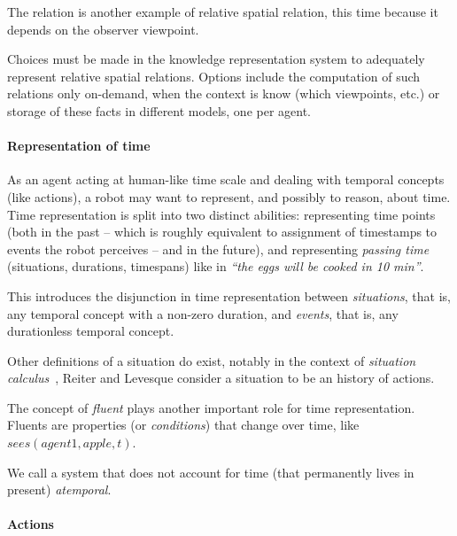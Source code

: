 The relation  is another example of relative spatial relation,
this time because it depends on the observer viewpoint.


Choices must be made in the knowledge representation system to adequately
represent relative spatial relations. Options include the computation of such
relations only on-demand, when the context is know (which viewpoints, etc.) or
storage of these facts in different models, one per agent.


\paragraph{Representation of time}

As an agent acting at human-like time scale and dealing with temporal concepts
(like actions), a robot may want to represent, and possibly to reason, about
time. Time representation is split into two distinct abilities: representing
time points (both in the past -- which is roughly equivalent to assignment of
timestamps to events the robot perceives -- and in the future), and
representing \emph{passing time} (situations, durations, timespans) like in
\emph{``the eggs will be cooked in 10 min''}.

This introduces the disjunction in time representation between
\emph{situations}, that is, any temporal concept with a non-zero duration, and
\emph{events}, that is, any durationless temporal concept.

Other definitions of a situation do exist, notably in the context of
\emph{situation calculus}~\cite{Levesque1998}, Reiter and Levesque consider a
situation to be an history of actions.


The concept of \emph{fluent} plays another important role for time
representation. Fluents are properties (or \emph{conditions}) that change over
time, like $sees(agent1, apple, t)$.

We call a system that does not account for time (\ie that permanently lives in
present) \emph{atemporal}.


\paragraph{Actions}

